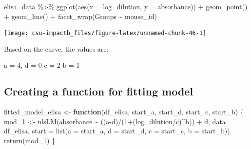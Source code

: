 \documentclass[
]{book}
\newenvironment{Shaded}{\begin{snugshade}}{\end{snugshade}}
\newcommand{\AttributeTok}[1]{\textcolor[rgb]{0.77,0.63,0.00}{#1}}
\newcommand{\ControlFlowTok}[1]{\textcolor[rgb]{0.13,0.29,0.53}{\textbf{#1}}}
\newcommand{\DecValTok}[1]{\textcolor[rgb]{0.00,0.00,0.81}{#1}}
\newcommand{\FunctionTok}[1]{\textcolor[rgb]{0.00,0.00,0.00}{#1}}
\newcommand{\NormalTok}[1]{#1}
\newcommand{\OtherTok}[1]{\textcolor[rgb]{0.56,0.35,0.01}{#1}}
\newcommand{\SpecialCharTok}[1]{\textcolor[rgb]{0.00,0.00,0.00}{#1}}
\begin{document}
\begin{Shaded}
\begin{Highlighting}[]
\NormalTok{elisa\_data }\SpecialCharTok{\%\textgreater{}\%}
  \FunctionTok{ggplot}\NormalTok{(}\FunctionTok{aes}\NormalTok{(}\AttributeTok{x =}\NormalTok{ log\_dilution, }\AttributeTok{y =}\NormalTok{ absorbance)) }\SpecialCharTok{+}
  \FunctionTok{geom\_point}\NormalTok{() }\SpecialCharTok{+}
  \FunctionTok{geom\_line}\NormalTok{() }\SpecialCharTok{+} 
  \FunctionTok{facet\_wrap}\NormalTok{(Groups }\SpecialCharTok{\textasciitilde{}}\NormalTok{ mouse\_id)}
\end{Highlighting}
\end{Shaded}

\begin{center}\texttt{[image: csu-impactb\_files/figure-latex/unnamed-chunk-46-1]} \end{center}

Based on the curve, the values are:

a = 4,
d = 0
c = 2
b = 1

\hypertarget{creating-a-function-for-fitting-model}{%
\subsection{Creating a function for fitting model}\label{creating-a-function-for-fitting-model}}

\begin{Shaded}
\begin{Highlighting}[]
\NormalTok{fitted\_model\_elisa }\OtherTok{\textless{}{-}} \ControlFlowTok{function}\NormalTok{(df\_elisa, }
\NormalTok{                               start\_a, start\_d, }
\NormalTok{                               start\_c, start\_b) \{}
\NormalTok{  mod\_1 }\OtherTok{\textless{}{-}} \FunctionTok{nlsLM}\NormalTok{(absorbance }\SpecialCharTok{\textasciitilde{}} 
\NormalTok{                   ((a}\SpecialCharTok{{-}}\NormalTok{d)}\SpecialCharTok{/}\NormalTok{(}\DecValTok{1}\SpecialCharTok{+}\NormalTok{(log\_dilution}\SpecialCharTok{/}\NormalTok{c)}\SpecialCharTok{\^{}}\NormalTok{b)) }\SpecialCharTok{+}\NormalTok{ d,}
\AttributeTok{data =}\NormalTok{ df\_elisa,}
\AttributeTok{start =} \FunctionTok{list}\NormalTok{(}\AttributeTok{a =}\NormalTok{ start\_a, }\AttributeTok{d =}\NormalTok{ start\_d, }\AttributeTok{c =}\NormalTok{ start\_c, }\AttributeTok{b =}\NormalTok{ start\_b))}
  \FunctionTok{return}\NormalTok{(mod\_1)}
\NormalTok{\}}
\end{Highlighting}
\end{Shaded}
\end{document}
